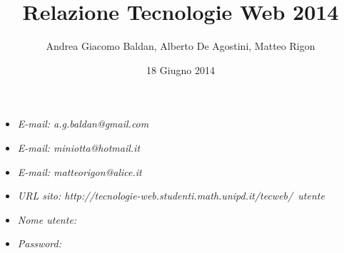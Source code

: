\documentclass[a4paper]{article}
\title{Relazione Tecnologie Web 2014}
\author{Andrea Giacomo Baldan, Alberto De Agostini, Matteo Rigon}
\date{18 Giugno 2014}
\begin{document}
\maketitle

\begin{itemize}
\item \emph{E-mail: a.g.baldan@gmail.com}
\item \emph{E-mail: miniotta@hotmail.it}
\item \emph{E-mail: matteorigon@alice.it}
\item \emph{URL sito: http://tecnologie-web.studenti.math.unipd.it/tecweb/~utente}
\item \emph{Nome utente: }
\item \emph{Password: }
\end{itemize}

%
%
%
%
\end{document}
